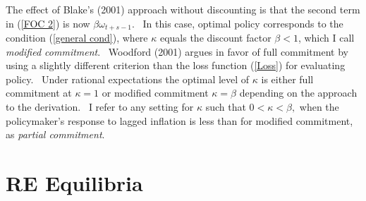 \documentclass{article}
\begin{document}
\begin{doublespace}
The effect of Blake's (2001) approach without discounting is that the second
term in (\ref{FOC 2}) is now $\beta \omega _{t+s-1}$. \ In this case,
optimal policy corresponds to the condition (\ref{general cond}), where $%
\kappa $ equals the discount factor $\beta <1$, which I call \textit{%
modified commitment}. \ Woodford (2001) argues in favor of full commitment
by using a slightly different criterion than the loss function (\ref{Loss})
for evaluating policy. \ Under rational expectations the optimal level of $%
\kappa $ is either full commitment at $\kappa =1$ or modified commitment $%
\kappa =\beta $ depending on the approach to the derivation. \ I refer to
any setting for $\kappa $ such that $0<\kappa <\beta ,$ when the
policymaker's response to lagged inflation is less than for modified
commitment, as \textit{partial commitment}.

\section{RE Equilibria}


\end{doublespace}
\end{document}
